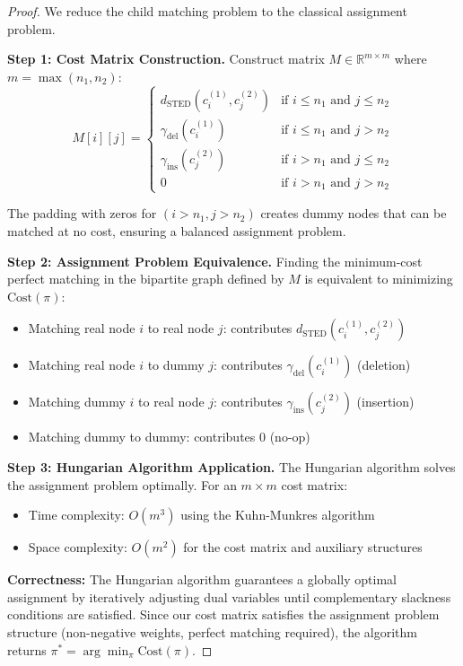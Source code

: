 \documentclass{article}
\begin{document}
\begin{proof}
We reduce the child matching problem to the classical assignment problem.

\textbf{Step 1: Cost Matrix Construction.}
Construct matrix $M \in \mathbb{R}^{m \times m}$ where $m = \max(n_1, n_2)$:
\begin{equation}
    M[i][j] = \begin{cases}
        d_{\text{STED}}(c_i^{(1)}, c_j^{(2)}) & \text{if } i \leq n_1 \text{ and } j \leq n_2 \\
        \gamma_{\text{del}}(c_i^{(1)}) & \text{if } i \leq n_1 \text{ and } j > n_2 \\
        \gamma_{\text{ins}}(c_j^{(2)}) & \text{if } i > n_1 \text{ and } j \leq n_2 \\
        0 & \text{if } i > n_1 \text{ and } j > n_2
    \end{cases}
\end{equation}

The padding with zeros for $(i > n_1, j > n_2)$ creates dummy nodes that can be matched at no cost, ensuring a balanced assignment problem.

\textbf{Step 2: Assignment Problem Equivalence.}
Finding the minimum-cost perfect matching in the bipartite graph defined by $M$ is equivalent to minimizing $\text{Cost}(\pi)$:
\begin{itemize}
    \item Matching real node $i$ to real node $j$: contributes $d_{\text{STED}}(c_i^{(1)}, c_j^{(2)})$
    \item Matching real node $i$ to dummy $j$: contributes $\gamma_{\text{del}}(c_i^{(1)})$ (deletion)
    \item Matching dummy $i$ to real node $j$: contributes $\gamma_{\text{ins}}(c_j^{(2)})$ (insertion)
    \item Matching dummy to dummy: contributes $0$ (no-op)
\end{itemize}

\textbf{Step 3: Hungarian Algorithm Application.}
The Hungarian algorithm \cite{kuhn1955hungarian,munkres1957algorithms} solves the assignment problem optimally. For an $m \times m$ cost matrix:
\begin{itemize}
    \item Time complexity: $O(m^3)$ using the Kuhn-Munkres algorithm
    \item Space complexity: $O(m^2)$ for the cost matrix and auxiliary structures
\end{itemize}

\textbf{Correctness:} The Hungarian algorithm guarantees a globally optimal assignment by iteratively adjusting dual variables until complementary slackness conditions are satisfied. Since our cost matrix satisfies the assignment problem structure (non-negative weights, perfect matching required), the algorithm returns $\pi^* = \arg\min_\pi \text{Cost}(\pi)$.
\end{proof}
\end{document}
